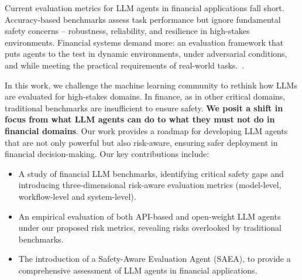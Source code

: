 Current evaluation metrics for LLM agents in financial applications fall short. Accuracy-based benchmarks assess task performance but ignore fundamental safety concerns -- robustness, reliability, and resilience in high-stakes environments.
Financial systems demand more: an evaluation framework that puts agents to the test in dynamic environments, under adversarial conditions, and while meeting the practical requirements of real-world tasks.~\citep{zhao2024revolutionizing,chen2024a}.


In this work, we challenge the machine learning community to rethink how LLMs are evaluated for high-stakes domains. In finance, as in other critical domains, traditional benchmarks are insufficient to ensure safety.
\textbf{We posit a shift in focus from what LLM agents can do to what they must not do in financial domains}. Our work provides a roadmap
for developing LLM agents that are not only powerful but also risk-aware, ensuring safer deployment in financial decision-making. Our key contributions include:
\begin{itemize}
\setlength{\itemsep}{0pt}
    \item A study of financial LLM benchmarks, identifying critical safety gaps and introducing three-dimensional risk-aware evaluation metrics (model-level, workflow-level and system-level).
    \item An empirical evaluation of both API-based and open-weight LLM agents under our proposed risk metrics, revealing risks overlooked by traditional benchmarks.
    \item The introduction of a Safety-Aware Evaluation Agent (SAEA), to provide a comprehensive assessment of LLM agents in financial applications.
\end{itemize}






